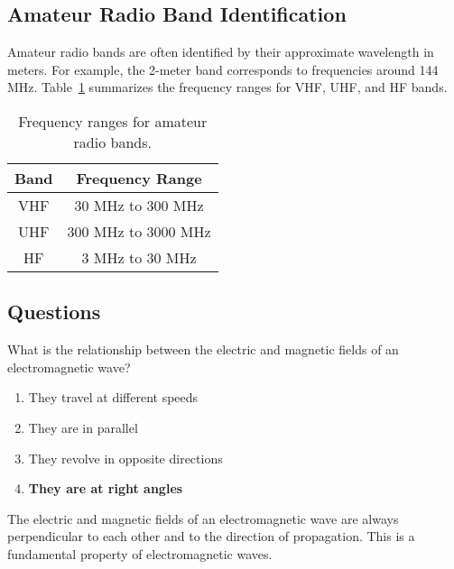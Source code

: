 \subsection*{Amateur Radio Band Identification}
Amateur radio bands are often identified by their approximate wavelength in meters. For example, the 2-meter band corresponds to frequencies around 144 MHz. Table~\ref{tab:frequency_ranges} summarizes the frequency ranges for VHF, UHF, and HF bands.

\begin{table}[h!]
    \centering
    \begin{tabular}{|c|c|}
        \hline
        \textbf{Band} & \textbf{Frequency Range} \\
        \hline
        VHF & 30 MHz to 300 MHz \\
        UHF & 300 MHz to 3000 MHz \\
        HF & 3 MHz to 30 MHz \\
        \hline
    \end{tabular}
    \caption{Frequency ranges for amateur radio bands.}
    \label{tab:frequency_ranges}
\end{table}

\subsection*{Questions}
\begin{tcolorbox}[colback=gray!10!white,colframe=black!75!black,title={T3B01}]
    What is the relationship between the electric and magnetic fields of an electromagnetic wave?
    \begin{enumerate}[label=\Alph*,noitemsep]
        \item They travel at different speeds
        \item They are in parallel
        \item They revolve in opposite directions
        \item \textbf{They are at right angles}
    \end{enumerate}
\end{tcolorbox}
The electric and magnetic fields of an electromagnetic wave are always perpendicular to each other and to the direction of propagation. This is a fundamental property of electromagnetic waves.


